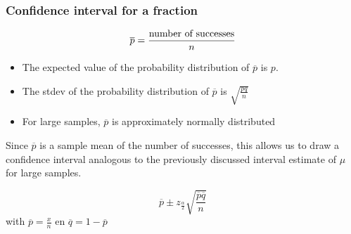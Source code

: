 \documentclass{beamer}
\begin{document}
\begin{frame}
  \frametitle{Confidence interval for a fraction}
  \[ \overline{p} = \frac{\textnormal{number of successes}}{n} \]
  \begin{itemize}
  \item The expected value of the probability distribution of $\overline{p}$ is $p$.
  \item The stdev of the probability distribution of  $\overline{p}$ is $\sqrt{\frac{pq}{n}}$
  \item For large samples, $\overline{p}$ is approximately normally distributed
\end{itemize}

Since $\overline{p}$ is a sample mean of the number of successes, this allows us to draw a confidence interval analogous to the previously discussed interval estimate of $\mu$ for large samples.

  \[ \overline{p} \pm z_{\frac{\alpha}{2}} \sqrt{\frac{\overline{p}\overline{q}}{n}} \]
  with $\overline{p} = \frac{x}{n}$ en $\overline{q} = 1- \overline{p}$

\end{frame}
\end{document}
